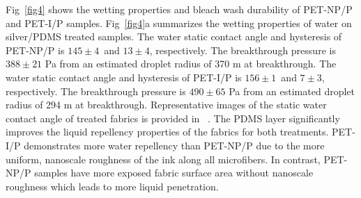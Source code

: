 \documentclass[10pt,letterpaper]{article}
\begin{document}


Fig~\ref{fig4} shows the wetting properties and bleach wash durability of PET-NP/P and PET-I/P samples. 
Fig~\ref{fig4}a summarizes the wetting properties of water on silver/PDMS treated samples. 
The water static contact angle and hysteresis of PET-NP/P is $145 \pm 4$\degree~and $13 \pm 4$\degree, respectively. 
The breakthrough pressure is $388 \pm 21$ Pa from an estimated droplet radius of 370 \micro m at breakthrough. 
The water static contact angle and hysteresis of PET-I/P is $156 \pm 1$\degree~and $7 \pm 3$\degree, respectively. The breakthrough pressure is $490 \pm 65$ Pa from an estimated droplet radius of 294 \micro m at breakthrough. 
Representative images of the static water contact angle of treated fabrics is provided in ~. 
The PDMS layer significantly improves the liquid repellency properties of the fabrics for both treatments. 
PET-I/P demonstrates more water repellency than PET-NP/P due to the more uniform, nanoscale roughness of the ink along all microfibers. 
In contrast, 
PET-NP/P %
samples 
have more exposed fabric surface area without nanoscale roughness which leads to more liquid penetration. 
\end{document}
